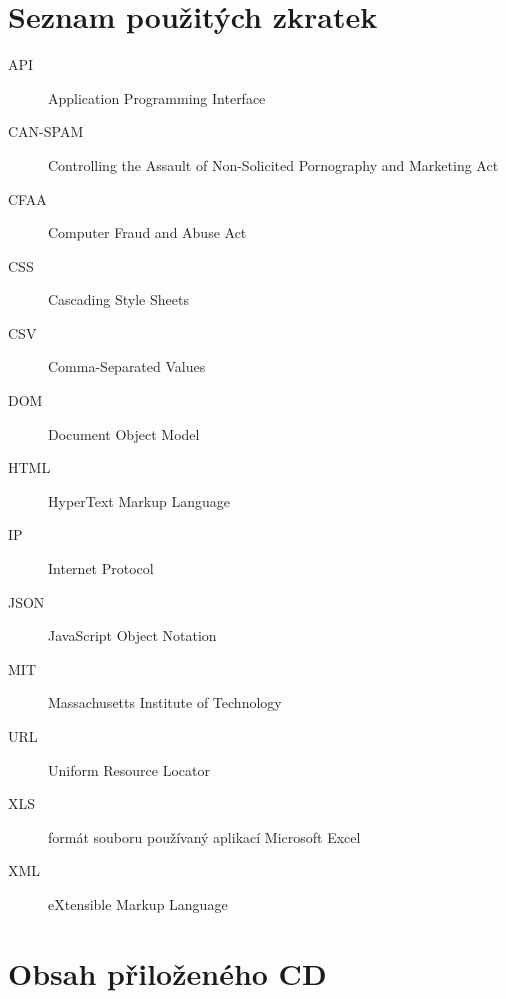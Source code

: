 \documentclass[thesis=B,czech]{FITthesis}[2012/06/26]
\begin{document}
\appendix




\chapter{Seznam použitých zkratek}
\begin{description}
	\item[API] Application Programming Interface
	\item[CAN-SPAM] Controlling the Assault of Non-Solicited Pornography and Marketing Act
	\item[CFAA] Computer Fraud and Abuse Act
	\item[CSS] Cascading Style Sheets
	\item[CSV] Comma-Separated Values
	\item[DOM] Document Object Model
	\item[HTML] HyperText Markup Language
	\item[IP] Internet Protocol
	\item[JSON] JavaScript Object Notation
	\item[MIT] Massachusetts Institute of Technology
	\item[URL] Uniform Resource Locator
	\item[XLS] formát souboru používaný aplikací Microsoft Excel
	\item[XML] eXtensible Markup Language
\end{description}


\chapter{Obsah přiloženého CD}


\begin{figure}
\end{figure}
\end{document}
